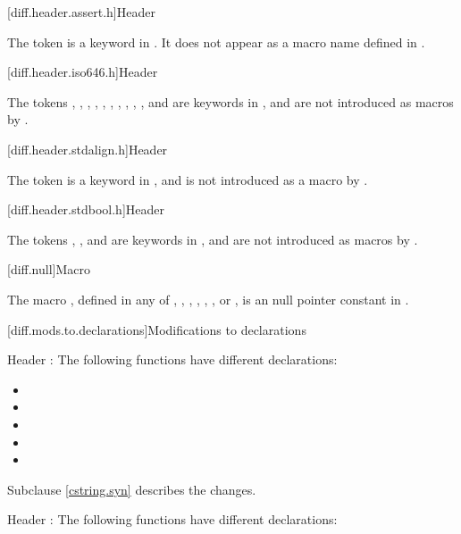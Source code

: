 [diff.header.assert.h]{Header }
%

\pnum
The token  is a keyword in \Cpp{}.
It does not appear as a macro name defined
in .

[diff.header.iso646.h]{Header }

\pnum
The tokens
,
,
,
,
,
,
,
,
,
,
and
are keywords in \Cpp{},
and are not introduced as macros
by .

[diff.header.stdalign.h]{Header }
%

\pnum
The token  is a keyword in \Cpp{},
and is not introduced as a macro
by .

[diff.header.stdbool.h]{Header }
%

\pnum
The tokens , , and 
are keywords in \Cpp{},
and are not introduced as macros
by .

[diff.null]{Macro }

\pnum
The macro
,
defined in any of
,
,
,
,
,
,
or ,
is an  null pointer constant in
\Cpp{}.

[diff.mods.to.declarations]{Modifications to declarations}

\pnum
Header :
The following functions have different declarations:

\begin{itemize}
\item {}
\item {}
\item {}
\item {}
\item {}
\end{itemize}

Subclause \ref{cstring.syn} describes the changes.

\pnum
Header :
The following functions have different declarations:

